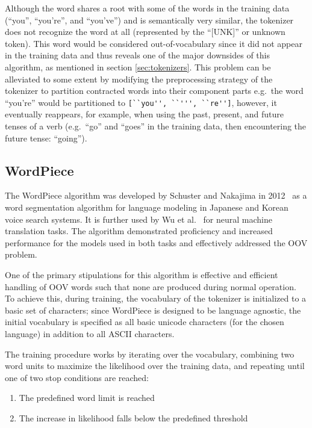 \documentclass[12pt]{article}
\begin{document}
\noindent
Although the word shares a root with some of the words in the training data (``you'', ``you're'', and ``you've'') and is semantically very similar,
the tokenizer does not recognize the word at all (represented by the ``[UNK]'' or unknown token). This word would be considered out-of-vocabulary
since it did not appear in the training data and thus reveals one of the major downsides of this algorithm, as mentioned in section
\ref{sec:tokenizers}. This problem can be alleviated to some extent by modifying the preprocessing strategy of the tokenizer to partition contracted
words into their component parts e.g.~the word ``you're'' would be partitioned to \lstinline|[``you'', ``''', ``re'']|, however, it eventually
reappears, for example, when using the past, present, and future tenses of a verb (e.g.~``go'' and ``goes'' in the training data, then encountering
the future tense: ``going'').

\subsection{WordPiece}\label{sec:wordpiece}
The WordPiece algorithm was developed by Schuster and Nakajima in 2012~\cite{schuster_japanese_2012} as a word segmentation algorithm for language
modeling in Japanese and Korean voice search systems. It is further used by Wu et al.~\cite{wu_googles_2016} for neural machine translation tasks. The
algorithm demonstrated proficiency and increased performance for the models used in both tasks and effectively addressed the OOV problem.

One of the primary stipulations for this algorithm is effective and efficient handling of OOV words such that none are produced during normal
operation. To achieve this, during training, the vocabulary of the tokenizer is initialized to a basic set of characters; since WordPiece is designed
to be language agnostic, the initial vocabulary is specified as all basic unicode characters (for the chosen language) in addition to all ASCII
characters.

The training procedure works by iterating over the vocabulary, combining two word units to maximize the likelihood over the training data, and
repeating until one of two stop conditions are reached:

\begin{enumerate}
    \item The predefined word limit is reached
    \item The increase in likelihood falls below the predefined threshold
\end{enumerate}
\end{document}
